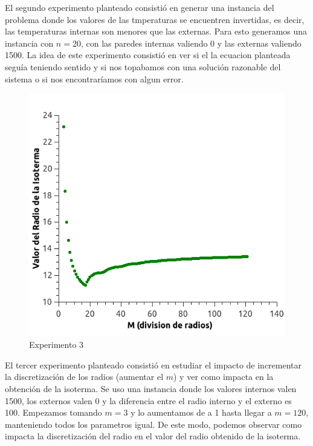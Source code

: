 El segundo experimento planteado consistió en generar una instancia del problema donde los valores de las tmperaturas se encuentren invertidas, es decir, las temperaturas internas son menores que las externas. Para esto generamos una instancia con $n=20$, con las paredes internas valiendo 0 y las externas valiendo 1500. La idea de este experimento consistió en ver si el la ecuacion planteada seguía teniendo sentido y si nos topabamos con una solución razonable del sistema o si nos encontraríamos con algun error.
\\
\begin{figure}
  \vspace{-20pt}
  \begin{center}
    \includegraphics[scale= 0.4]{imagenes/graphDiscretizacion.png}
  \end{center}
  \vspace{-20pt}
  \caption{Experimento 3}
  \vspace{-10pt}
  \label{fig:Exp3}
\end{figure}

El tercer experimento planteado consistió en estudiar el impacto de incrementar la discretización de los radios (aumentar el $m$) y ver como impacta en la obtención de la isoterma. Se uso una instancia donde los valores internos valen 1500, los externos valen 0 y la diferencia entre el radio interno y el externo es 100. Empezamos tomando $m=3$ y lo aumentamos de a 1 hasta llegar a $m=120$, manteniendo todos los parametros igual. De este modo, podemos observar como impacta la discretización del radio en el valor del radio obtenido de la isoterma.

